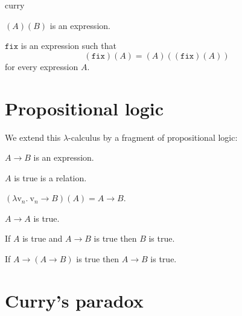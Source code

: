 \documentclass{stex}
\newcommand{\var}[1]{\mathrm{v}_{#1}}
\newcommand{\abs}[2]{\lambda\var{#1}.\ #2}
\newcommand{\app}[2]{(#1)(#2)}
\newcommand{\fix}{\mathtt{fix}}
\begin{document}
\begin{smodule}{curry}
\begin{forthel}
  \begin{signature*}[Application]\label{application}
    $\app{A}{B}$ is an expression.
  \end{signature*}

  \begin{signature*}\label{fixed_point_combinator}
    $\fix$ is an expression such that
    \[\app{\fix}{A} = \app{A}{\app{\fix}{A}}\]
    for every expression $A$.
  \end{signature*}
\end{forthel}


\section*{Propositional logic}

\begin{sparagraph}
  \noindent We extend this $\lambda$-calculus by a fragment of propositional logic:
\end{sparagraph}

\begin{forthel}
  \begin{signature*}[Implication]\label{implication}
    $A \rightarrow B$ is an expression.
  \end{signature*}

  \begin{signature*}\label{truth}
    $A$ is true is a relation.
  \end{signature*}

  \begin{axiom}\label{beta_reduction}
    $\app{\abs{n}{\var{n} \rightarrow B}}{A} = A \rightarrow B$.
  \end{axiom}

  \begin{axiom}\label{reflexivity}
    $A \rightarrow A$ is true.
  \end{axiom}

  \begin{axiom}\label{modus_ponens}
    If $A$ is true and $A \rightarrow B$ is true then $B$ is true.
  \end{axiom}

  \begin{axiom}\label{strengthening}
    If $A \rightarrow (A \rightarrow B)$ is true then $A \rightarrow B$ is true.
  \end{axiom}
\end{forthel}


\section*{Curry's paradox}


\end{smodule}
\end{document}
